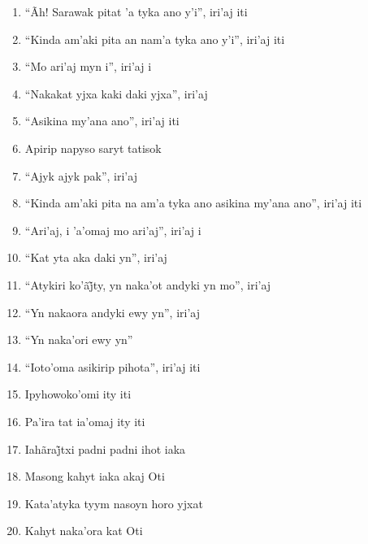 \begin{enumerate}
 \item ``Ãh! Sarawak pitat 'a tyka ano y'i'', iri'aj iti

 \item ``Kinda am'aki pita an nam'a tyka ano y'i'', iri'aj iti

 \item ``Mo ari'aj myn i'', iri'aj i

 \item ``Nakakat yjxa kaki daki yjxa'', iri'aj

 \item ``Asikina my'ana ano'', iri'aj iti

 \item Apirip napyso saryt tatisok

 \item ``Ajyk ajyk pak'', iri'aj

 \item ``Kinda am'aki pita na am'a tyka ano asikina my'ana ano'', iri'aj iti

 \item ``Ari'aj, i 'a'omaj mo ari'aj'', iri'aj i

 \item ``Kat yta aka daki yn'', iri'aj

 \begin{center}\end{center}

 \item ``Atykiri ko’ãj̃ty, yn naka’ot andyki yn mo'', iri’aj

 \item ``Yn nakaora andyki ewy yn'', iri'aj

 \item ``Yn naka'ori ewy yn''

 \item ``Ioto'oma asikirip pihota'', iri'aj iti

 \item Ipyhowoko'omi ity iti

 \item Pa'ira tat ia'omaj ity iti

 \item Iahãraj̃txi padni padni ihot iaka

 \item Masong kahyt iaka akaj Oti

 \item Kata'atyka tyym nasoyn horo yjxat

 \item Kahyt naka'ora kat Oti


\end{enumerate}

